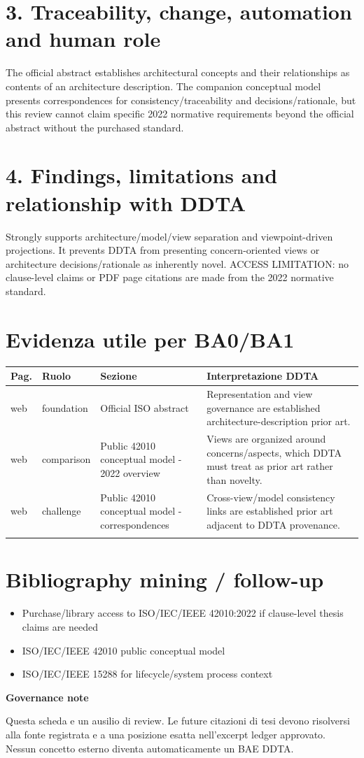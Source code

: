 \documentclass[10pt,a4paper]{article}
\newenvironment{challenge}[1]{\def\FrameCommand{\fcolorbox{ddtaorange}{ddtagray}}\MakeFramed{\advance\hsize-2\width\FrameRestore}\noindent\textbf{#1}\par\smallskip}{\endMakeFramed}
\begin{document}
\section{3. Traceability, change, automation and human role}
The official abstract establishes architectural concepts and their relationships as contents of an architecture description. The companion conceptual model presents correspondences for consistency/traceability and decisions/rationale, but this review cannot claim specific 2022 normative requirements beyond the official abstract without the purchased standard.
\section{4. Findings, limitations and relationship with DDTA}
Strongly supports architecture/model/view separation and viewpoint-driven projections. It prevents DDTA from presenting concern-oriented views or architecture decisions/rationale as inherently novel. ACCESS LIMITATION: no clause-level claims or PDF page citations are made from the 2022 normative standard.
\section{Evidenza utile per BA0/BA1}
\begin{longtable}{p{1.2cm}p{2.0cm}p{4.0cm}p{8.0cm}}
\toprule
Pag. & Ruolo & Sezione & Interpretazione DDTA\\
\midrule
\endhead
web & foundation & Official ISO abstract & Representation and view governance are established architecture-description prior art.\\
\addlinespace[.3em]
web & comparison & Public 42010 conceptual model - 2022 overview & Views are organized around concerns/aspects, which DDTA must treat as prior art rather than novelty.\\
\addlinespace[.3em]
web & challenge & Public 42010 conceptual model - correspondences & Cross-view/model consistency links are established prior art adjacent to DDTA provenance.\\
\addlinespace[.3em]
\bottomrule
\end{longtable}
\section{Bibliography mining / follow-up}
\begin{itemize}
\item Purchase/library access to ISO/IEC/IEEE 42010:2022 if clause-level thesis claims are needed
\item ISO/IEC/IEEE 42010 public conceptual model
\item ISO/IEC/IEEE 15288 for lifecycle/system process context
\end{itemize}
\begin{challenge}{Governance note}
Questa scheda e un ausilio di review. Le future citazioni di tesi devono risolversi alla fonte registrata e a una posizione esatta nell'excerpt ledger approvato. Nessun concetto esterno diventa automaticamente un BAE DDTA.
\end{challenge}
\end{document}
